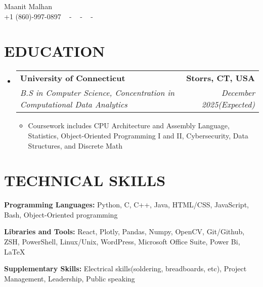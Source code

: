 \documentclass[letterpaper,11pt]{article}
\makeatletter
\newcommand{\resumeItem}[1]{
  \item\small{
    {#1 \vspace{-1pt}}
  }
}
\newcommand{\resumeSubheading}[4]{
  \vspace{-2pt}\item
    \begin{tabular*}{1.0\textwidth}[t]{l@{\extracolsep{\fill}}r}
      \textbf{\large#1} & \textbf{\small #2} \\
      \textit{\large#3} & \textit{\small #4} \\
      
    \end{tabular*}\vspace{-7pt}
}
\newcommand{\resumeSubHeadingListStart}{\begin{itemize}[leftmargin=0.0in, label={}]}
\newcommand{\resumeSubHeadingListEnd}{\end{itemize}}
\newcommand{\resumeItemListStart}{\begin{itemize}[leftmargin=0.1in]}
\newcommand{\resumeItemListEnd}{\end{itemize}\vspace{-5pt}}
\makeatother
\begin{document}


\begin{center}
    {\huge Maanit Malhan} \\ \vspace{2pt} 
    {+1 (860)-997-0897} ~ 
    \small{-}
    \href{mailto:[maanitmalhan@gmail.com]}{\color{blue}{maanitmalhan@gmail.com}} ~ 
    \small{-}
    \href{[https://www.linkedin.com/in/maanit-malhan/]}{ \color{blue}{https://www.linkedin.com/in/maanit-malhan}}  ~
    \small{-}
    \href{[Maanit Malhan]}{ \color{blue}{https://github.com/maanitmalhan}} ~
    \vspace{-7pt}
\end{center}

\section{\color{airforceblue}EDUCATION}
  \resumeSubHeadingListStart
    \resumeSubheading
      {University of Connecticut}{Storrs, CT, USA}
      {B.S in Computer Science, Concentration in Computational Data Analytics}{December 2025(Expected)}
       \resumeItemListStart
            \resumeItem{\normalsize{Coursework includes CPU Architecture and Assembly Language, Statistics, Object-Oriented Programming I and II, Cybersecurity, Data Structures, and Discrete Math}}
            
      \resumeItemListEnd  
    \vspace{-4pt}
     
  \resumeSubHeadingListEnd
  \vspace{-10pt}

\section{\color{airforceblue}TECHNICAL SKILLS}
 \begin{itemize}[leftmargin=0in, label={}]
    \small{\item{
     \textbf{\normalsize{Programming Languages:}}{ \normalsize{Python, C, C++, Java, HTML/CSS, JavaScript, Bash, Object-Oriented programming}} \\
      \vspace{1.2pt}
      
     \textbf{\normalsize{Libraries and Tools:}}{ \normalsize{React, Plotly, Pandas, Numpy, OpenCV, Git/Github, ZSH, PowerShell, Linux/Unix, WordPress, Microsoft Office Suite, Power Bi, LaTeX}} \\
      \vspace{1.2pt}
      
     \textbf{\normalsize{Supplementary Skills:}}{ \normalsize{Electrical skills(soldering, breadboards, etc), Project Management, Leadership, Public speaking}}

     }}
 \end{itemize}
 \vspace{-16pt}
 
\end{document}
